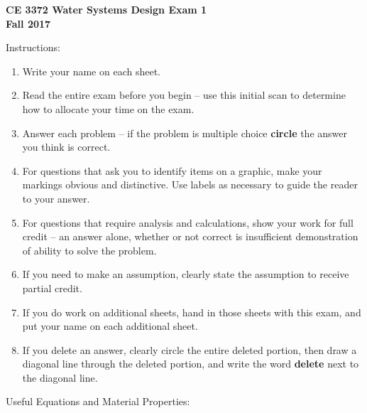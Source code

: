 \documentclass[11pt]{article}
\begin{document}
\begingroup
\begin{center}
{\textbf{{ CE 3372 Water Systems Design Exam 1 }\\{Fall 2017}} }
\end{center}
\endgroup
Instructions:
\begin{enumerate}
\item Write your name on each sheet.
\item Read the entire exam before you begin -- use this initial scan to determine how to allocate your time on the exam.
\item Answer each problem -- if the problem is multiple choice \textbf{circle} the answer you think is correct.
\item For questions that ask you to identify items on a graphic, make your markings obvious and distinctive.  Use labels as necessary to guide the reader to your answer.
\item For questions that require analysis and calculations, show your work for full credit -- an answer alone, whether or not correct is insufficient demonstration of ability to solve the problem.
\item If you need to make an assumption, clearly state the assumption to receive partial credit.
\item If you do work on additional sheets, hand in those sheets with this exam, and put your name on each additional sheet.
\item If you delete an answer, clearly circle the entire deleted portion, then draw a diagonal line through the deleted portion, and write the word \textbf{delete} next to the diagonal line.
\end{enumerate}
Useful Equations and Material Properties: \\~\\
\end{document}
